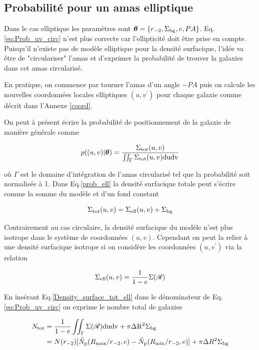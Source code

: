 \documentclass[a4paper,11pt]{article}
\numberwithin{equation}{section}
\begin{document}
  \subsection{Probabilité pour un amas elliptique}
  Dans le cas elliptique les paramètres sont $\bm{\theta} = \lbrace r_{-2} , \Sigma_{\rm{bg}} , e , PA \rbrace$. Eq.\ref{eq:Prob_uv_circ} n'est plus correcte car l'ellipticité doit être prise en compte. Puisqu'il n'existe pas de modèle elliptique pour la densité surfacique, l'idée va être de "circulariser" l'amas et d'exprimer la probabilité de trouver la galaxies dans cet amas circularisé.\par
	En pratique, on commence par tourner l'amas d'un angle $-PA$ puis on calcule les nouvelles coordonnées locales elliptiques $(u, v^{'})$  pour chaque galaxie comme décrit dans l'Annexe \ref{coord}.\par
	On peut à présent écrire la probabilité de positionnement de la galaxie de manière générale comme
	
	\begin{equation}
		\label{prob_ell}
		p( (u,v) | \bm{\theta}) = \frac{\Sigma_{\rm{tot}} (u,v)}{\iint_{\Gamma} \Sigma_{\rm{tot}} (u,v) \rm{du} \rm{dv} }
	\end{equation}
	
	où $\Gamma$ est le domaine d'intégration de l'amas circularisé tel que la probabilité soit normalisée à 1. Dans Eq.\ref{prob_ell} la densité surfacique totale peut s'écrire comme la somme du modèle et d'un fond constant 
	
	\begin{equation}
		\label{Density_surface_tot_ell}
		\Sigma_{\rm{tot}} (u,v) = \Sigma_{\rm{ell}} (u,v) + \Sigma_{\rm{bg}}	
	\end{equation}		

	Contrairement au cas circulaire, la densité surfacique du modèle n'est plus isotrope dans le système de coordonnées $(u,v)$. Cependant on peut la relier à une densité surfacique isotrope si on considère les coordonnées $(u, v^{'})$ via la relation
	
	\begin{equation}
		\label{Density_surface_link}
		\Sigma_{\rm{ell}} (u,v)= \frac{1}{1-e} \Sigma ( \mathscr{R} )
	\end{equation}
	
	En insérant Eq.\ref{Density_surface_tot_ell} dans le dénominateur de Eq.\ref{eq:Prob_uv_circ} on exprime le nombre total de galaxies
	
	\begin{equation}
		\label{eq:N_tot_ell}
		\begin{split}
			N_{\rm{tot}} & = \frac{1}{1-e} \iint_{\Gamma} \Sigma ( \mathscr{R} ) \rm{du} \rm{dv} + \pi \Delta R^2 \Sigma_{\rm{bg}} \\
			& = N(r_{-2}) [ \tilde{N}_{\rm{p}} (R_{\rm{max}}/r_{-2}, e) - \tilde{N}_{\rm{p}} (R_{\rm{min}}/r_{-2}, e) ] + \pi \Delta R^2 \Sigma_{\rm{bg}}
		\end{split}
	\end{equation}
	
\end{document}
